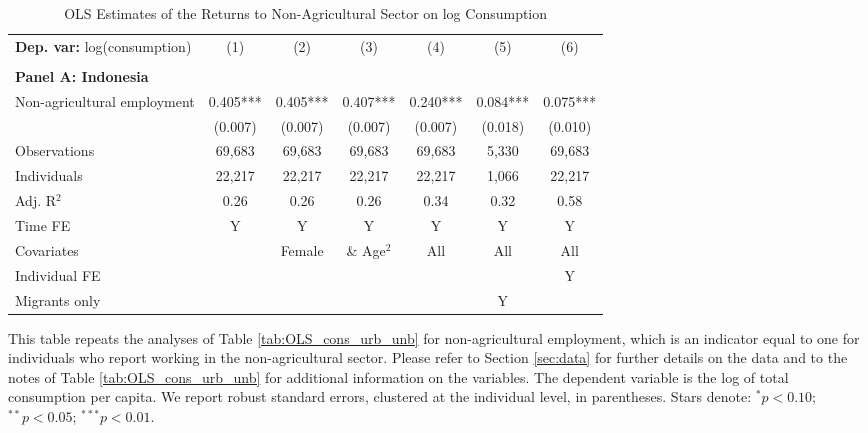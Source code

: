 \begin{table}[htbp] \centering \begin{threeparttable}
 \caption{OLS Estimates of the Returns to Non-Agricultural Sector on log Consumption} 
 \label{tab:OLS_cons_nonag_unb} 
\begin{tabular}{l cccccc} \toprule  \textbf{Dep. var:}  log(consumption) 
                    &\multicolumn{1}{c}{(1)}   &\multicolumn{1}{c}{(2)}   &\multicolumn{1}{c}{(3)}   &\multicolumn{1}{c}{(4)}   &\multicolumn{1}{c}{(5)}   &\multicolumn{1}{c}{(6)}   \\
                    &               &               &               &               &               &               \\
\textbf{Panel A: Indonesia} \\
Non-agricultural employment&       0.405***&       0.405***&       0.407***&       0.240***&       0.084***&       0.075***\\
                    &     (0.007)   &     (0.007)   &     (0.007)   &     (0.007)   &     (0.018)   &     (0.010)   \\
\addlinespace
Observations        &      69,683   &      69,683   &      69,683   &      69,683   &       5,330   &      69,683   \\
Individuals         &      22,217   &      22,217   &      22,217   &      22,217   &       1,066   &      22,217   \\
Adj. R$^{2}$        &        0.26   &        0.26   &        0.26   &        0.34   &        0.32   &        0.58   \\
\cmidrule{2 -7} Time FE & Y & Y & Y & Y & Y & Y \\ Covariates & & Female & \& Age$^2$ & All & All & All \\ Individual FE & & & & & & Y \\ Migrants only & & & & & Y & \\ \bottomrule \end{tabular} \begin{tablenotes}[flushleft] \footnotesize \item{This table repeats the analyses of Table \ref{tab:OLS_cons_urb_unb}  for non-agricultural employment, which is an indicator equal to one for individuals who report working in the non-agricultural sector. Please refer to Section \ref{sec:data} for further details on the data and to the notes of Table \ref{tab:OLS_cons_urb_unb} for additional information on the variables. The dependent variable is the log of total consumption per capita. We report robust standard errors, clustered at the individual level, in parentheses. Stars denote: $^{*} p<0.10$; $^{**} p<0.05$; $^{***} p<0.01$.} \end{tablenotes} \end{threeparttable} \end{table}
